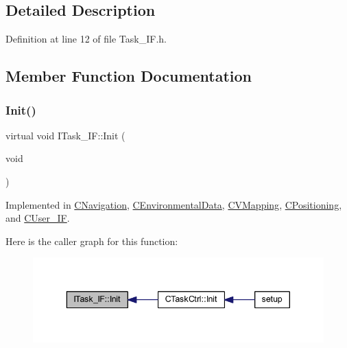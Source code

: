 \subsection{Detailed Description}


Definition at line 12 of file Task\+\_\+\+I\+F.\+h.



\subsection{Member Function Documentation}
\mbox{\label{class_i_task___i_f_a28f608bdb9b19658403f7b9b7421968d}} 
\subsubsection{\texorpdfstring{Init()}{Init()}}
{\footnotesize\ttfamily virtual void I\+Task\+\_\+\+I\+F\+::\+Init (\begin{DoxyParamCaption}\item[{void}]{ }\end{DoxyParamCaption})\hspace{0.3cm}{\ttfamily [pure virtual]}}



Implemented in \mbox{\hyperlink{class_c_navigation_a86a0756663ccf76e9c474764b8f7a04f}{C\+Navigation}}, \mbox{\hyperlink{class_c_environmental_data_a3321cce122ef1e1f7e995ee51353e87d}{C\+Environmental\+Data}}, \mbox{\hyperlink{class_c_v_mapping_a110257122b8946bcb8f17051070e03eb}{C\+V\+Mapping}}, \mbox{\hyperlink{class_c_positioning_abdceba66e701554a178acf61c61b0df6}{C\+Positioning}}, and \mbox{\hyperlink{class_c_user___i_f_a02c8bba754c77583dc5afaa6877dc547}{C\+User\+\_\+\+IF}}.

Here is the caller graph for this function\+:\nopagebreak
\begin{figure}[H]
\begin{center}
\leavevmode
\includegraphics[width=343pt]{class_i_task___i_f_a28f608bdb9b19658403f7b9b7421968d_icgraph}
\end{center}
\end{figure}
\mbox{\label{class_i_task___i_f_ab73cc5879a61d00fc59b72cce32cc6f7}} 
